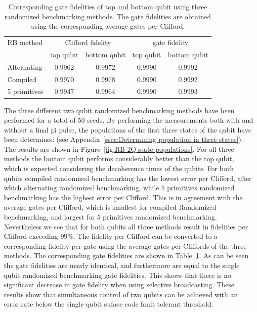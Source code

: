       \begin{table}
        \begin{tabular}{l c c c c}
          \toprule
          RB method     & \multicolumn{2}{c}{Clifford fidelity} & \multicolumn{2}{c}{gate fidelity}\\
          \cmidrule(lr){2-3}
          \cmidrule(lr){4-5}
                        & top qubit & bottom qubit & top qubit & bottom qubit \\
          \midrule
          Alternating   & 0.9962 & 0.9972 & 0.9990 & 0.9992 \\
          Compiled      & 0.9970 & 0.9978 & 0.9990 & 0.9992 \\
          5 primitives  & 0.9947 & 0.9964 & 0.9990 & 0.9993 \\
          \bottomrule
        \end{tabular}
        \caption{Corresponding gate fidelities of top and bottom qubit using three randomized benchmarking methods. The gate fidelities are obtained using the corresponding average gates per Clifford.}
        \label{tab:RB 2Q converted gate fidelities}
      \end{table}

          The three different two qubit randomized benchmarking methods have been performed for a total of $50$ seeds. By performing the measurements both with and without a final pi pulse, the populations of the first three states of the qubit have been determined (see Appendix~\ref{ssec:Determining population in three states}). The results are shown in Figure~\ref{fig:RB 2Q state populations}. For all three methods the bottom qubit performs considerably better than the top qubit, which is expected considering the decoherence times of the qubits. For both qubits compiled randomized benchmarking has the lowest error per Clifford, after which alternating randomized benchmarking, while $5$ primitives randomized benchmarking has the highest error per Clifford. This is in agreement with the average gates per Clifford, which is smallest for compiled Randomized benchmarking, and largest for $5$ primitives randomized benchmarking. Nevertheless we see that for both qubits all three methods result in fidelities per Clifford exceeding $99\%$. The fidelity per Clifford can be converted to a corresponding fidelity per gate using the average gates per Cliffords of the three methods. The corresponding gate fidelities are shown in Table~\ref{tab:RB 2Q converted gate fidelities}. As can be seen the gate fidelities are nearly identical, and furthermore are equal to the single qubit randomized benchmarking gate fidelities. This shows that there is no significant decrease in gate fidelity when using selective broadcasting. These results show that simultaneous control of two qubits can be achieved with an error rate below the single qubit suface code fault tolerant threshold.


